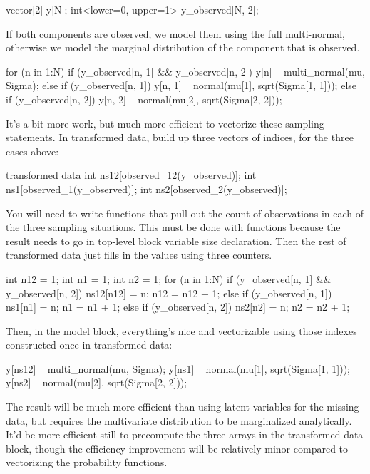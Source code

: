 \begin{stancode}
vector[2] y[N];
int<lower=0, upper=1> y_observed[N, 2];
\end{stancode}

If both components are observed, we model them using the full
multi-normal, otherwise we model the marginal distribution of the
component that is observed.

\begin{stancode}
for (n in 1:N) {
  if (y_observed[n, 1] && y_observed[n, 2])
    y[n] ~ multi_normal(mu, Sigma);
  else if (y_observed[n, 1])
    y[n, 1] ~ normal(mu[1], sqrt(Sigma[1, 1]));
  else if (y_observed[n, 2])
    y[n, 2] ~ normal(mu[2], sqrt(Sigma[2, 2]));
}
\end{stancode}

It's a bit more work, but much more efficient to vectorize these
sampling statements.  In transformed data, build up three vectors of
indices, for the three cases above:
%
\begin{stancode}
transformed data {
  int ns12[observed_12(y_observed)];
  int ns1[observed_1(y_observed)];
  int ns2[observed_2(y_observed)];
}
\end{stancode}
%
You will need to write functions that pull out the count of
observations in each of the three sampling situations.  This must be
done with functions because the result needs to go in top-level block
variable size declaration.  Then the rest of transformed data just
fills in the values using three counters.
%
\begin{stancode}
int n12 = 1;
int n1 = 1;
int n2 = 1;
for (n in 1:N) {
  if (y_observed[n, 1] && y_observed[n, 2]) {
    ns12[n12] = n;
    n12 = n12 + 1;
  } else if (y_observed[n, 1]) {
    ns1[n1] = n;
    n1 = n1 + 1;
  } else if (y_observed[n, 2]) {
    ns2[n2] = n;    
    n2 = n2 + 1;
  }
}
\end{stancode}
%
Then, in the model block, everything's nice and vectorizable
using those indexes constructed once in transformed data:
%
\begin{stancode}
y[ns12] ~ multi_normal(mu, Sigma);
y[ns1] ~ normal(mu[1], sqrt(Sigma[1, 1]));
y[ns2] ~ normal(mu[2], sqrt(Sigma[2, 2]));
\end{stancode}
%
The result will be much more efficient than using latent variables for
the missing data, but requires the multivariate distribution to be
marginalized analytically.  It'd be more efficient still to precompute
the three arrays in the transformed data block, though the efficiency
improvement will be relatively minor compared to vectorizing the
probability functions.

